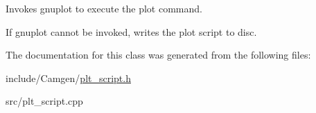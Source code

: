 Invokes gnuplot to execute the plot command. 

If gnuplot cannot be invoked, writes the plot script to disc. 

The documentation for this class was generated from the following files\-:\begin{DoxyCompactItemize}
\item 
include/\-Camgen/\hyperlink{a00699}{plt\-\_\-script.\-h}\item 
src/plt\-\_\-script.\-cpp\end{DoxyCompactItemize}
